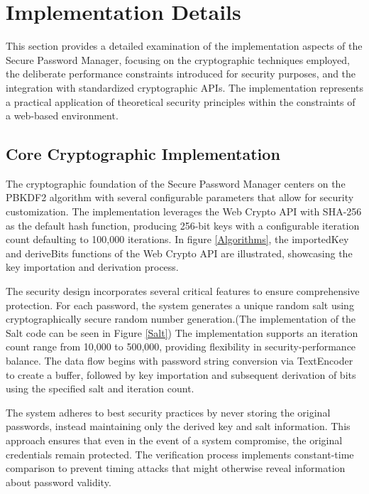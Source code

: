 \documentclass[11pt,a4paper]{article}
\begin{document}
\section{Implementation Details}
This section provides a detailed examination of the implementation aspects of the Secure Password Manager, focusing on the cryptographic techniques employed, the deliberate performance constraints introduced for security purposes, and the integration with standardized cryptographic APIs. The implementation represents a practical application of theoretical security principles within the constraints of a web-based environment.
\subsection{Core Cryptographic Implementation}
The cryptographic foundation of the Secure Password Manager centers on the PBKDF2 algorithm with several configurable parameters that allow for security customization. The implementation leverages the Web Crypto API with SHA-256 as the default hash function, producing 256-bit keys with a configurable iteration count defaulting to 100,000 iterations. In figure \ref{Algorithms}, the importedKey and deriveBits functions of the Web Crypto API are illustrated, showcasing the key importation and derivation process.


The security design incorporates several critical features to ensure comprehensive protection. For each password, the system generates a unique random salt using cryptographically secure random number generation.(The implementation of the Salt code can be seen in Figure \ref{Salt}) The implementation supports an iteration count range from 10,000 to 500,000, providing flexibility in security-performance balance. The data flow begins with password string conversion via TextEncoder to create a buffer, followed by key importation and subsequent derivation of bits using the specified salt and iteration count.


The system adheres to best security practices by never storing the original passwords, instead maintaining only the derived key and salt information. This approach ensures that even in the event of a system compromise, the original credentials remain protected. The verification process implements constant-time comparison to prevent timing attacks that might otherwise reveal information about password validity.
\end{document}
